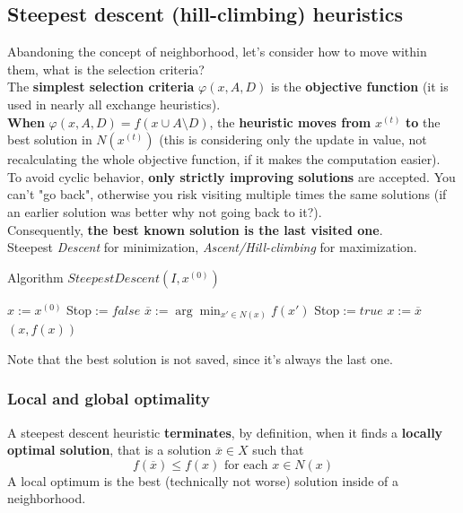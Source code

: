\documentclass[11pt]{article}
\begin{document}
	\newpage
	
	\subsection{Steepest descent (hill-climbing) heuristics}
	Abandoning the concept of neighborhood, let's consider how to move within them, what is the selection criteria?\\
	
	The \textbf{simplest selection criteria} $\varphi (x, A, D)$ is the \textbf{objective function} (it is used in nearly all exchange heuristics).\\
	
	\textbf{When} $\varphi (x, A, D) = f (x \cup A \setminus D)$, the \textbf{heuristic moves from} $x^{(t)}$ \textbf{to} the best solution in $N (x^{(t)})$ (this is considering only the update in value, not recalculating the whole objective function, if it makes the computation easier).\\
	
	To avoid cyclic behavior, \textbf{only strictly improving solutions} are accepted. You can't "go back", otherwise you risk visiting multiple times the same solutions (if an earlier solution was better why not going back to it?).\\
	Consequently, \textbf{the best known solution is the last visited one}.\\
	
	Steepest \textit{Descent} for minimization, \textit{Ascent/Hill-climbing} for maximization.
	\begin{algorithm}
		\caption{Algorithm $SteepestDescent(I , x^{(0)})$}
		\begin{algorithmic}
			\STATE $x := x^{(0)}$
			\STATE Stop$ := false$
				\STATE $\overline{x} := \arg \min_{x' \in N(x)} f(x')$
					\STATE Stop$ := true$
				\ELSE 
					\STATE $x := \overline{x}$
				\ENDIF
			\ENDWHILE
			\RETURN $(x, f (x))$
		\end{algorithmic}
	\end{algorithm}
	Note that the best solution is not saved, since it's always the last one.\\
	
	\newpage
	
	\subsubsection{Local and global optimality}
	A steepest descent heuristic \textbf{terminates}, by definition, when it finds a \textbf{locally optimal solution}, that is a solution $\overline{x} \in X$ such that
	$$ f (\overline{x}) \leq f (x) \text{ for each } x \in N (x) $$
	A local optimum is the best (technically not worse) solution inside of a neighborhood. 
	
\end{document}
